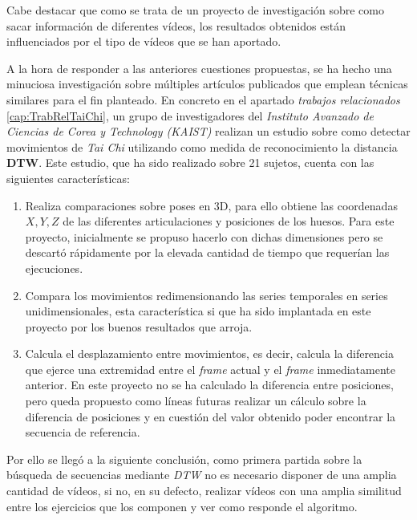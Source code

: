 Cabe destacar que como se trata de un proyecto de investigación sobre como sacar información de diferentes vídeos, los resultados obtenidos están influenciados por el tipo de vídeos que se han aportado. 

A la hora de responder a las anteriores cuestiones propuestas, se ha hecho una minuciosa investigación sobre múltiples artículos publicados que emplean técnicas similares para el fin planteado. En concreto en el apartado \textit{trabajos relacionados} \ref{cap:TrabRelTaiChi}, un grupo de investigadores del \textit{Instituto Avanzado de Ciencias de Corea y Technology (KAIST)} realizan un estudio sobre como detectar movimientos de \textit{Tai Chi} utilizando como medida de reconocimiento la distancia \textbf{DTW}. Este estudio, que ha sido realizado sobre 21 sujetos, cuenta con las siguientes características: 
\begin{enumerate}
    \item Realiza comparaciones sobre poses en 3D, para ello obtiene las coordenadas $X, Y, Z$ de las diferentes articulaciones y posiciones de los huesos. Para este proyecto, inicialmente se propuso hacerlo con dichas dimensiones pero se descartó rápidamente por la elevada cantidad de tiempo que requerían las ejecuciones.
    \item Compara los movimientos redimensionando las series temporales en series unidimensionales, esta característica si que ha sido implantada en este proyecto por los buenos resultados que arroja.
    \item Calcula el desplazamiento entre movimientos, es decir, calcula la diferencia que ejerce una extremidad entre el \textit{frame} actual y el \textit{frame} inmediatamente anterior. En este proyecto no se ha calculado la diferencia entre posiciones, pero queda propuesto como líneas futuras realizar un cálculo sobre la diferencia de posiciones y en cuestión del valor obtenido poder encontrar la secuencia de referencia. 
\end{enumerate}

Por ello se llegó a la siguiente conclusión, como primera partida sobre la búsqueda de secuencias mediante \emph{DTW} no es necesario disponer de una amplia cantidad de vídeos, si no, en su defecto, realizar vídeos con una amplia similitud entre los ejercicios que los componen y ver como responde el algoritmo. 

